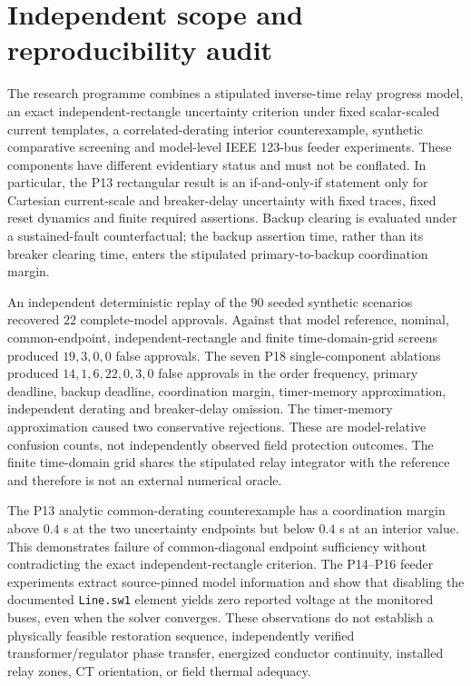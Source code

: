 \section{Independent scope and reproducibility audit}
\label{sec:p19-audit}
The research programme combines a stipulated inverse-time relay progress model, an exact independent-rectangle uncertainty criterion under fixed scalar-scaled current templates, a correlated-derating interior counterexample, synthetic comparative screening and model-level IEEE 123-bus feeder experiments. These components have different evidentiary status and must not be conflated. In particular, the P13 rectangular result is an if-and-only-if statement only for Cartesian current-scale and breaker-delay uncertainty with fixed traces, fixed reset dynamics and finite required assertions. Backup clearing is evaluated under a sustained-fault counterfactual; the backup assertion time, rather than its breaker clearing time, enters the stipulated primary-to-backup coordination margin.

An independent deterministic replay of the \(90\) seeded synthetic scenarios recovered \(22\) complete-model approvals. Against that model reference, nominal, common-endpoint, independent-rectangle and finite time-domain-grid screens produced \(19,3,0,0\) false approvals. The seven P18 single-component ablations produced \(14,1,6,22,0,3,0\) false approvals in the order frequency, primary deadline, backup deadline, coordination margin, timer-memory approximation, independent derating and breaker-delay omission. The timer-memory approximation caused two conservative rejections. These are model-relative confusion counts, not independently observed field protection outcomes. The finite time-domain grid shares the stipulated relay integrator with the reference and therefore is not an external numerical oracle.

The P13 analytic common-derating counterexample has a coordination margin above \(0.4\) s at the two uncertainty endpoints but below \(0.4\) s at an interior value. This demonstrates failure of common-diagonal endpoint sufficiency without contradicting the exact independent-rectangle criterion. The P14--P16 feeder experiments extract source-pinned model information and show that disabling the documented \texttt{Line.sw1} element yields zero reported voltage at the monitored buses, even when the solver converges. These observations do not establish a physically feasible restoration sequence, independently verified transformer/regulator phase transfer, energized conductor continuity, installed relay zones, CT orientation, or field thermal adequacy.

